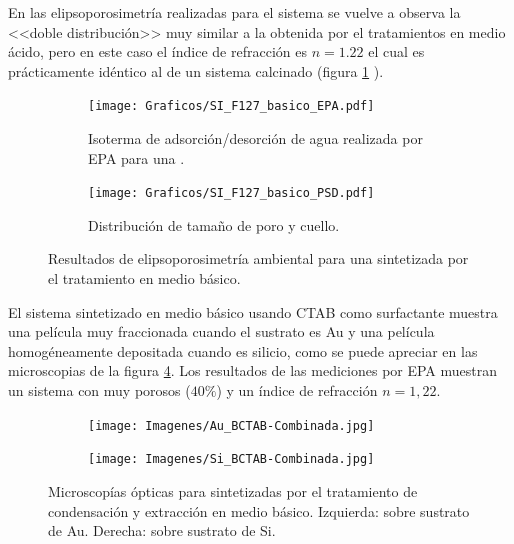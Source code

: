 {		En las elipsoporosimetría realizadas para el sistema \pdmF\space se vuelve a observa la <<doble distribución>> muy similar a la obtenida por el tratamientos en medio ácido, pero en este caso el índice de refracción es $n=1.22$ el cual es prácticamente idéntico al de un sistema calcinado (figura \ref{fig:F127_basico_EPA} ).

		\begin{figure}[!ht]
		  	\begin{subfigure}[t]{0.495\textwidth}
		  	\texttt{[image: Graficos/SI\_F127\_basico\_EPA.pdf]}
			\caption[Elipsoporsimetría \pdmF\space tratamiento básico.]{Isoterma de adsorción/desorción de agua realizada por EPA para una \pdmF.}
			\label{fig:F127_basico_EPA}
			\end{subfigure}
			\begin{subfigure}[t]{0.495\textwidth}
		  	\texttt{[image: Graficos/SI\_F127\_basico\_PSD.pdf]}
			\caption{Distribución de tamaño de poro y cuello.\\ }
			\label{fig:F127_basico_PSD}
			\end{subfigure}
			\caption[Elipsoporosimetría \pdmF\space tratamiento básico.]{Resultados de elipsoporosimetría ambiental para una \pdmF\space sintetizada por el tratamiento en medio básico.}
			\end{figure}

		El sistema sintetizado en medio básico usando CTAB como surfactante muestra una película muy fraccionada cuando el sustrato es Au y una película homogéneamente depositada cuando es silicio, como se puede apreciar en las microscopias de la figura \ref{fig:Microscopia_CTAB_basico}. Los resultados de las mediciones por EPA muestran un sistema con muy porosos ($40\%$) y un índice de refracción $n=1,22$.
			
		\begin{figure}[!th]
 	   	    \begin{subfigure}[t]{0.49\textwidth}
	       	\texttt{[image: Imagenes/Au\_BCTAB-Combinada.jpg]}
	   		\end{subfigure}
	   		\begin{subfigure}[t]{0.49\textwidth}
	   	    \texttt{[image: Imagenes/Si\_BCTAB-Combinada.jpg]}
	   		\end{subfigure}
			 \caption[Microscopía óptica \pdmC tratamiento en medio básico.]{Microscopías ópticas para \pdmC\space sintetizadas por el tratamiento de condensación y extracción en medio básico. Izquierda: sobre sustrato de Au. Derecha: sobre sustrato de Si.}
			 \label{fig:Microscopia_CTAB_basico}	
		     \end{figure}		

}
